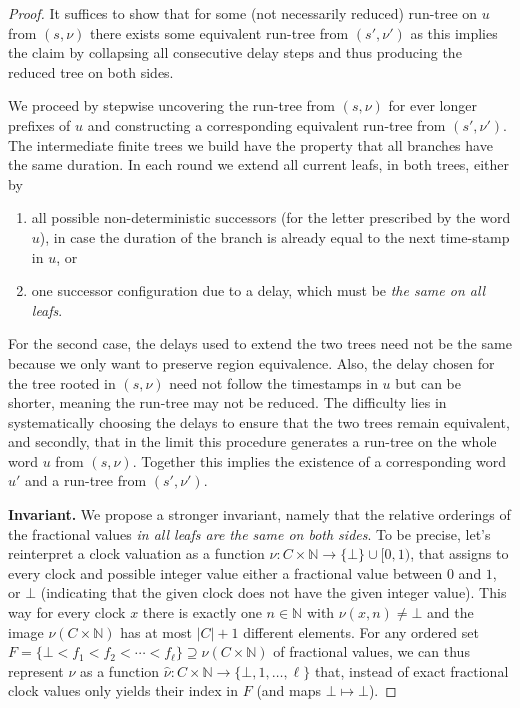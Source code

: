 \documentclass[10pt,a4paper]{amsart}
\theoremstyle{definition}
\numberwithin{equation}{section}
\newcommand{\N}{\mathbb{N}}
\newcommand{\x}{\times}
\newcommand{\card}[1]{|#1|}
\newcommand{\clocks}{C}
\begin{document}
\begin{proof}
    It suffices to show that for some (not necessarily reduced) run-tree on $u$ from $(s,\nu)$
    there exists some equivalent run-tree from $(s',\nu')$ as this implies the claim by collapsing all consecutive delay steps and thus producing the reduced tree on both sides.

    We proceed by stepwise uncovering the run-tree from $(s,\nu)$
    for ever longer prefixes of $u$
    and constructing a corresponding equivalent run-tree from $(s',\nu')$.
    The intermediate finite trees we build have the property that all branches have the same duration.
    In each round we extend all current leafs, in both trees, either by
    \begin{enumerate}
        \item all possible non-deterministic successors (for the letter prescribed by the word $u$),
    in case the duration of the branch is already equal to the next time-stamp in $u$, or
\item one successor configuration due to a delay, which must be \emph{the same on all leafs}.
    \end{enumerate}
    For the second case, the delays used to extend the two trees need not be the same
    because we only want to preserve region equivalence.
    Also, the delay chosen for the tree rooted in $(s,\nu)$ need not follow the
    timestamps in $u$ but can be shorter, meaning the run-tree may not be reduced.
    The difficulty lies in systematically choosing the delays to ensure that the two trees remain equivalent, and secondly, that in the limit this procedure generates a run-tree on the whole word $u$ from $(s,\nu)$.
    Together this implies the existence of a corresponding word $u'$ and a run-tree from $(s',\nu')$.
    
    \medskip
    \textbf{Invariant.}
    We propose a stronger invariant, namely that the relative orderings of the fractional values
    \emph{in all leafs are the same on both sides}.
    To be precise, 
    let's reinterpret a clock valuation as a function $\nu:\clocks\x\N\to\{\bot\}\cup[0,1)$,
    that assigns to every clock and possible integer value either a fractional value between $0$ and $1$,
    or $\bot$ (indicating that the given clock does not have the given integer value). 
    This way for every clock $x$ there is exactly one $n\in\N$ with $\nu(x,n)\neq\bot$
    and the image $\nu(\clocks\x\N)$ has at most $\card{\clocks}+1$ different elements.
    For any ordered set $F=\{\bot<f_1<f_2<\cdots<f_\ell\}\supseteq\nu(\clocks\x\N)$ of fractional values, we can thus represent $\nu$
    as a function $\hat{\nu}:\clocks\x\N\to \{\bot,1,\ldots, \ell\}$ that, instead of exact fractional clock values only yields their index in $F$ (and maps $\bot\mapsto\bot$).


\end{proof}
\end{document}
